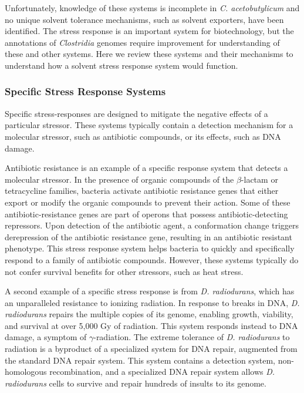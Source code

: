 Unfortunately, knowledge of these systems is incomplete in \textit{C. acetobutylicum} and no unique solvent tolerance mechanisms, such as solvent exporters, have been identified. The stress response is an important system for biotechnology, but the annotations of \textit{Clostridia} genomes require improvement for understanding of these and other systems. Here we review these systems and their mechanisms to understand how a solvent stress response system would function.


\subsubsection{Specific Stress Response Systems}
Specific stress-responses are designed to mitigate the negative effects of a particular stressor. These systems typically contain a detection mechanism for a molecular stressor, such as antibiotic compounds,\cite{127} or its effects, such as DNA damage.\cite{128}

Antibiotic resistance is an example of a specific response system that detects a molecular stressor. In the presence of organic compounds of the $\beta$-lactam\cite{127} or tetracycline families,\cite{130} bacteria activate antibiotic resistance genes that either export or modify the organic compounds to prevent their action. Some of these antibiotic-resistance genes are part of operons that possess antibiotic-detecting repressors.\cite{127} Upon detection of the antibiotic agent, a conformation change triggers derepression of the antibiotic resistance gene, resulting in an antibiotic resistant phenotype. This stress response system helps bacteria to quickly and specifically respond to a family of antibiotic compounds. However, these systems typically do not confer survival benefits for other stressors, such as heat stress.

A second example of a specific stress response is from \textit{D. radiodurans}, which has an unparalleled resistance to ionizing radiation.\cite{129} In response to breaks in DNA, \textit{D. radiodurans} repairs the multiple copies of its genome, enabling growth, viability, and survival at over 5,000 Gy of radiation.\cite{129} This system responds instead to DNA damage, a symptom of $\gamma$-radiation. The extreme tolerance of \textit{D. radiodurans} to radiation is a byproduct of a specialized system for DNA repair,\cite{129} augmented from the standard DNA repair system.\cite{128} This system contains a detection system, non-homologous recombination, and a specialized DNA repair system allows \textit{D. radiodurans} cells to survive and repair hundreds of insults to its genome. 

